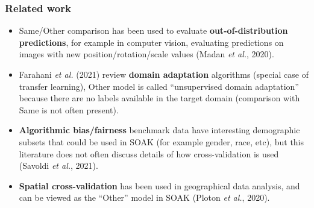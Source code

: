 \documentclass[t]{beamer}
\begin{document}

   



\begin{frame}
  \frametitle{Related work}
  \begin{itemize}
  \item Same/Other comparison has been used to evaluate
    \textbf{out-of-distribution predictions}, for example in computer vision,
    evaluating predictions on images with new position/rotation/scale
    values (Madan \emph{et al.}, 2020).
  \item Farahani \emph{et al.} (2021) review \textbf{domain
      adaptation} algorithms (special case of transfer learning),
    Other model is called ``unsupervised domain adaptation'' because there
    are no labels available in the target domain (comparison with Same
    is not often present).
  \item \textbf{Algorithmic bias/fairness} benchmark data have interesting
    demographic subsets that could be used in SOAK (for example
    gender, race, etc), but this literature does not often discuss
    details of how cross-validation is used (Savoldi \emph{et al.}, 2021).
  \item \textbf{Spatial cross-validation} has been used in geographical
    data analysis, and can be viewed as the ``Other'' model in SOAK
    (Ploton \emph{et al.}, 2020).
  \end{itemize}
\end{frame}
\end{document}
